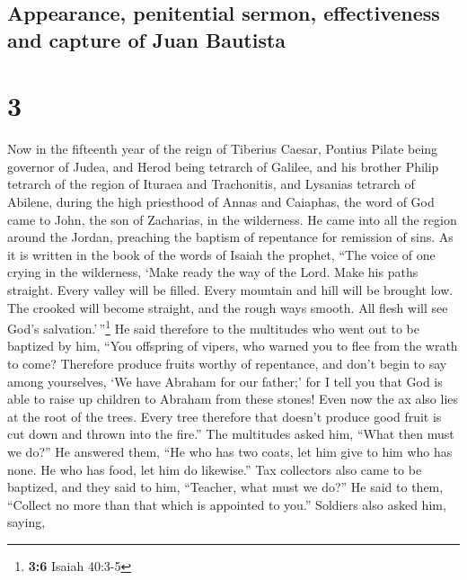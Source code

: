 \hypertarget{appearance-penitential-sermon-effectiveness-and-capture-of-juan-bautista}{%
\subsection{Appearance, penitential sermon, effectiveness and capture of
Juan
Bautista}\label{appearance-penitential-sermon-effectiveness-and-capture-of-juan-bautista}}

\hypertarget{section-2}{%
\section{3}\label{section-2}}

 Now in the fifteenth year of the reign of Tiberius
Caesar, Pontius Pilate being governor of Judea, and Herod being tetrarch
of Galilee, and his brother Philip tetrarch of the region of Ituraea and
Trachonitis, and Lysanias tetrarch of Abilene,  during the
high priesthood of Annas and Caiaphas, the word of God came to John, the
son of Zacharias, in the wilderness.  He came into all the
region around the Jordan, preaching the baptism of repentance for
remission of sins.  As it is written in the book of the
words of Isaiah the prophet, ``The voice of one crying in the
wilderness, `Make ready the way of the Lord. Make his paths straight.
 Every valley will be filled. Every mountain and hill will
be brought low. The crooked will become straight, and the rough ways
smooth.  All flesh will see God's
salvation.'\,''\footnote{\textbf{3:6} Isaiah 40:3-5}  He
said therefore to the multitudes who went out to be baptized by him,
``You offspring of vipers, who warned you to flee from the wrath to
come?  Therefore produce fruits worthy of repentance, and
don't begin to say among yourselves, `We have Abraham for our father;'
for I tell you that God is able to raise up children to Abraham from
these stones!  Even now the ax also lies at the root of
the trees. Every tree therefore that doesn't produce good fruit is cut
down and thrown into the fire.''  The multitudes asked
him, ``What then must we do?''  He answered them, ``He
who has two coats, let him give to him who has none. He who has food,
let him do likewise.''  Tax collectors also came to be
baptized, and they said to him, ``Teacher, what must we do?''
 He said to them, ``Collect no more than that which is
appointed to you.''  Soldiers also asked him, saying,
